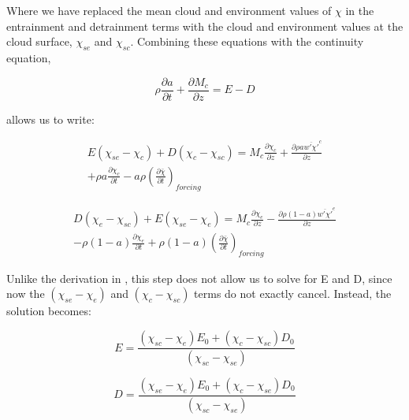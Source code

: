 \documentclass[12pt]{article}
\begin{document}
Where we have replaced the mean cloud and environment values of $\chi$ in the 
entrainment and detrainment terms with the cloud and environment 
values at the cloud surface, $\chi_{se}$ and $\chi_{sc}$.  Combining these 
equations with the continuity equation, 

\begin{equation}
    \label{eq:continuity}
    \rho \frac{\partial a}{\partial t} 
    + \frac{\partial M_c}{\partial z}
    = E - D
\end{equation}

allows us to write:

\begin{equation}
  \label{eq:entrainment_2}
  \begin{split}
    E (\chi_{se} - \chi_c) + D (\chi_c - \chi_{sc}) 
    = M_c \frac{\partial \chi_c}{\partial z}
    + \frac{\partial \rho a \overline{w' \chi'}^c}{\partial z} \\
    + \rho a \frac{\partial \chi_c}{\partial t}
    - a \rho \left(\frac{\partial \bar{\chi}}{\partial t}\right)_{forcing}
  \end{split}
\end{equation}

\begin{equation}
  \label{eq:detrainment_2}
  \begin{split}
    D (\chi_e - \chi_{sc}) + E (\chi_{se} - \chi_e)
    = M_c \frac{\partial \chi_e}{\partial z}
    - \frac{\partial \rho (1 - a) \overline{w' \chi'}^e}{\partial z} \\
    - \rho (1 - a) \frac{\partial \chi_e}{\partial t}
    + \rho (1 - a) \left(\frac{\partial \bar{\chi}}{\partial t}\right)_{forcing}
  \end{split}
\end{equation}

Unlike the derivation in \cite{Siebesma1995}, this step does not allow us to 
solve for E and D, since now the $(\chi_{se} - \chi_e)$ and 
$(\chi_c - \chi_{sc})$ terms do not exactly cancel.  Instead, the solution 
becomes:

\begin{equation}
  \label{eq:final_entrainment}
    E = \frac{(\chi_{sc} - \chi_e)E_0 + (\chi_c - \chi_{sc})D_0}
             {(\chi_{sc} - \chi_{se})}
\end{equation}

\begin{equation}
  \label{eq:final_detrainment}
    D = \frac{(\chi_{se} - \chi_e)E_0 + (\chi_c - \chi_{se})D_0}
             {(\chi_{sc} - \chi_{se})}
\end{equation}
\end{document}

